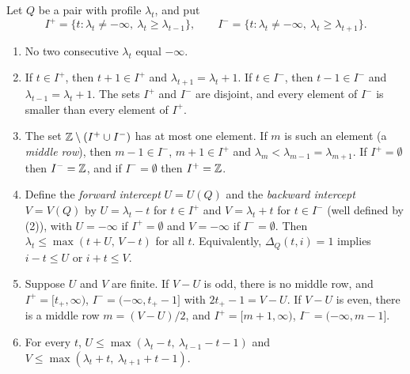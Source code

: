 \begin{proposition}\label{r30:prop:profile}
Let $Q$ be a pair with profile $\lambda_t$, and put
\[
I^+=\{t:\lambda_t\ne-\infty,\ \lambda_t\ge\lambda_{t-1}\},\qquad I^-=\{t:\lambda_t\ne-\infty,\ \lambda_t\ge\lambda_{t+1}\}.
\]
\begin{enumerate}
\item No two consecutive $\lambda_t$ equal $-\infty$.
\item If $t\in I^+$, then $t+1\in I^+$ and $\lambda_{t+1}=\lambda_t+1$. If $t\in I^-$, then $t-1\in I^-$ and $\lambda_{t-1}=\lambda_t+1$. The sets $I^+$ and $I^-$ are disjoint, and every element of $I^-$ is smaller than every element of $I^+$.
\item The set $\mathbb{Z}\setminus(I^+\cup I^-)$ has at most one element. If $m$ is such an element (a \emph{middle row}), then $m-1\in I^-$, $m+1\in I^+$ and $\lambda_m<\lambda_{m-1}=\lambda_{m+1}$. If $I^+=\emptyset$ then $I^-=\mathbb{Z}$, and if $I^-=\emptyset$ then $I^+=\mathbb{Z}$.
\item Define the \emph{forward intercept} $U=U(Q)$ and the \emph{backward intercept} $V=V(Q)$ by $U=\lambda_t-t$ for $t\in I^+$ and $V=\lambda_t+t$ for $t\in I^-$ (well defined by (2)), with $U=-\infty$ if $I^+=\emptyset$ and $V=-\infty$ if $I^-=\emptyset$. Then $\lambda_t\le\max(t+U,\,V-t)$ for all $t$. Equivalently, $\Delta_Q(t,i)=1$ implies $i-t\le U$ or $i+t\le V$.
\item Suppose $U$ and $V$ are finite. If $V-U$ is odd, there is no middle row, and $I^+=[t_+,\infty)$, $I^-=(-\infty,t_+-1]$ with $2t_+-1=V-U$. If $V-U$ is even, there is a middle row $m=(V-U)/2$, and $I^+=[m+1,\infty)$, $I^-=(-\infty,m-1]$.
\item For every $t$, $U\le\max(\lambda_t-t,\ \lambda_{t-1}-t-1)$ and $V\le\max(\lambda_t+t,\ \lambda_{t+1}+t-1)$.
\end{enumerate}
\end{proposition}

